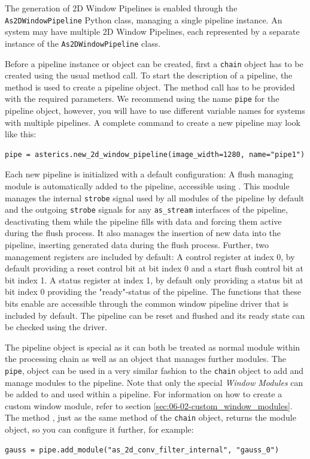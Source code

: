 The generation of 2D Window Pipelines is enabled through the \texttt{As2DWindowPipeline} Python class, managing a single pipeline instance.
An \asterics system may have multiple 2D Window Pipelines, each represented by a separate instance of the \texttt{As2DWindowPipeline} class.
 
Before a pipeline instance or object can be created, first a \texttt{chain} object has to be created using the usual  method call.
To start the description of a pipeline, the method  is used to create a pipeline object.
The method call has to be provided with the required parameters.
We recommend using the name \texttt{pipe} for the pipeline object, however, you will have to use different variable names for systems with multiple pipelines.
A complete command to create a new pipeline may look like this:
\begin{lstlisting}[style=AutomaticsPython]
pipe = asterics.new_2d_window_pipeline(image_width=1280, name="pipe1")
\end{lstlisting}

Each new pipeline is initialized with a default configuration:
A flush managing module is automatically added to the pipeline, accessible using .
This module manages the internal \texttt{strobe} signal used by all modules of the pipeline by default and the outgoing \texttt{strobe} signals for any \texttt{as\_stream} interfaces of the pipeline, deactivating them while the pipeline fills with data and forcing them active during the flush process.
It also manages the insertion of new data into the pipeline, inserting generated data during the flush process.
Further, two management registers are included by default:
A control register at index 0, by default providing a reset control bit at bit index 0 and a start flush control bit at bit index 1. 
A status register at index 1, by default only providing a status bit at bit index 0 providing the "ready"-status of the pipeline.
The functions that these bits enable are accessible through the common window pipeline driver that is included by default.
The pipeline can be reset and flushed and its ready state can be checked using the driver.

The pipeline object is special as it can both be treated as normal \asterics module within the processing chain as well as an object that manages further \asterics modules.
The \texttt{pipe}, object can be used in a very similar fashion to the \texttt{chain} object to add and manage modules to the pipeline.
Note that only the special \textit{Window Modules} can be added to and used within a pipeline.
For information on how to create a custom window module, refer to section \ref{sec:06-02-custom_window_modules}.
The method , just as the same method of the \texttt{chain} object, returns the module object, so you can configure it further, for example:
\begin{lstlisting}[style=AutomaticsPython]
gauss = pipe.add_module("as_2d_conv_filter_internal", "gauss_0")
\end{lstlisting}

